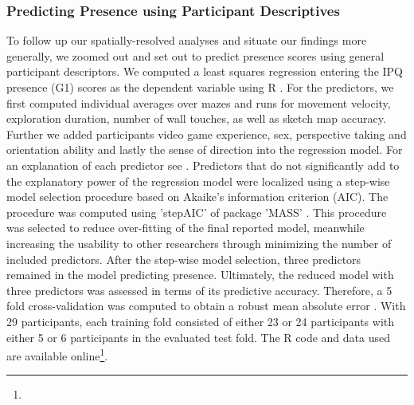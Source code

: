 \subsubsection{Predicting Presence using Participant Descriptives} 
To follow up our spatially-resolved analyses and situate our findings more generally, we zoomed out and set out to predict presence scores using general participant descriptors. We computed a least squares regression entering the IPQ presence (G1) scores as the dependent variable using R \cite{RFoundationforStatisticalComputing.2018}. For the predictors, we first computed individual averages over mazes and runs for movement velocity, exploration duration, number of wall touches, as well as sketch map accuracy. Further we added participants video game experience, sex, perspective taking and orientation ability and lastly the sense of direction into the regression model. For an explanation of each predictor see \cite{}. Predictors that do not significantly add to the explanatory power of the regression model were localized using a step-wise model selection procedure based on Akaike's information criterion (AIC). The procedure was computed using 'stepAIC' of package 'MASS' \cite{Akaike1998a, Venables2002}. This procedure was selected to reduce over-fitting of the final reported model, meanwhile increasing the usability to other researchers through minimizing the number of included predictors. After the step-wise model selection, three predictors remained in the model predicting presence. Ultimately, the reduced model with three predictors was assessed in terms of its predictive accuracy. Therefore, a 5 fold cross-validation was computed to obtain a robust mean absolute error \cite{Mosteller1968, Furnkranz2011}. With 29 participants, each training fold consisted of either 23 or 24 participants with either 5 or 6 participants in the evaluated test fold. The R code and data used are available online\footnote{}.

